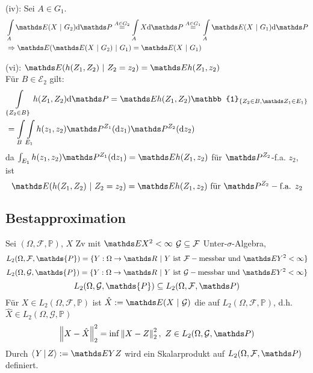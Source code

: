 (iv): Sei $A\in G_1$.
\begin{equation*}
\begin{aligned}
	&\int\limits_A \E(X~|~G_2)\dint\Pw \stackrel{A\in G_2}{=} \int\limits_A X\dint\Pw \stackrel{A\in G_1}{=} \int\limits_A \E(X~|~G_1)\dint\Pw\\
	&\Rightarrow \E(\E(X~|~G_2)~|~G_1)=\E(X~|~G_1)
\end{aligned}
\end{equation*}

(vi): \zz $\E(h(Z_1,Z_2)~|~ Z_2=z_2)=\E h(Z_1,z_2)$\\
Für $B\in \mathcal{E}_2$ gilt:
\begin{equation*}
\begin{aligned}
	&\int\limits_{\{Z_2\in B\}} h(Z_1,Z_2)\dint\Pw = \E h(Z_1,Z_2)\mathbb{1}_{\{Z_2\in B,\Z_1\in E_1 \}}\\
	&=\int\limits_B\int\limits_{E_1}h(z_1,z_2)\Pw^{Z_1}(\dint z_1)\Pw^{Z_2}(\dint z_2)
\end{aligned}
\end{equation*}
da $\int_{E_1}h(z_1,z_2)\Pw^{Z_1}(\dint z_1)= \E h(Z_1,z_2)$ für $\Pw^{Z_2}$-f.a. $z_2$, ist 
\[
\E(h(Z_1,Z_2)~|~ Z_2=z_2)=\E h(Z_1,z_2) \text{ für }\Pw^{Z_2}-\text{f.a. } z_2 
\]

\subsection{Bestapproximation}
Sei $(\Omega,\mathcal{F},\mathds{P})$, $X$ Zv mit $\E X^2<\infty$ $\mathcal{G}\subseteq \mathcal{F}$ Unter-$\sigma$-Algebra,
\[
L_2(\Omega,\mathcal{F},\mathds{P})= \{Y:\Omega\to \R~|~Y \text{ ist }\mathcal{F}-\text{messbar und }\E Y^2<\infty \} 
\]
\[
L_2(\Omega,\mathcal{G},\mathds{P})= \{Y:\Omega\to \R~|~Y \text{ ist }\G-\text{messbar und }\E Y^2<\infty \} 
\]
\[
L_2(\Omega,\mathcal{G},\mathds{P})\subseteq L_2(\Omega,\mathcal{F},\Pw)
\]
Für $X\in L_2(\Omega,\mathcal{F},\mathds{P})$ ist $\hat{X}:= \E(X~|~\mathcal{G})$ die  auf $L_2(\Omega,\mathcal{F},\mathds{P})$, d.h. $\hat{X}\in L_2(\Omega,\mathcal{G},\mathds{P})$
\[
\norm{X-\hat{X}}_2^2=\inf\norm{X-Z}_2^2,~Z\in L_2(\Omega,\G,\Pw) 
\]
Durch $\sprod{Y}{Z}:=\E YZ $ wird ein Skalarprodukt auf $L_2(\Omega,\mathcal{F},\Pw)$ definiert.

